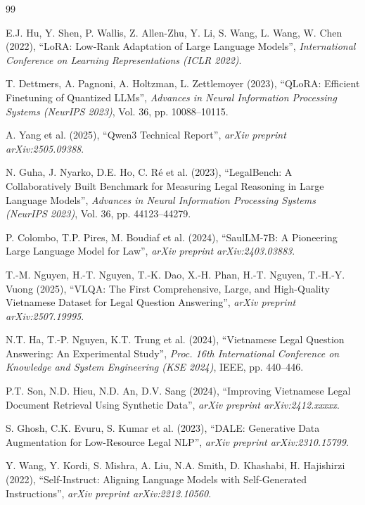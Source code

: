 \begin{thebibliography}{99}

E.J. Hu, Y. Shen, P. Wallis, Z. Allen-Zhu, Y. Li, S. Wang, L. Wang, W. Chen (2022),
``LoRA: Low-Rank Adaptation of Large Language Models'',
\textit{International Conference on Learning Representations (ICLR 2022)}.

T. Dettmers, A. Pagnoni, A. Holtzman, L. Zettlemoyer (2023),
``QLoRA: Efficient Finetuning of Quantized LLMs'',
\textit{Advances in Neural Information Processing Systems (NeurIPS 2023)},
Vol. 36, pp. 10088--10115.

A. Yang et al. (2025),
``Qwen3 Technical Report'',
\textit{arXiv preprint arXiv:2505.09388}.

N. Guha, J. Nyarko, D.E. Ho, C. R\'{e} et al. (2023),
``LegalBench: A Collaboratively Built Benchmark for Measuring Legal Reasoning
in Large Language Models'',
\textit{Advances in Neural Information Processing Systems (NeurIPS 2023)},
Vol. 36, pp. 44123--44279.

P. Colombo, T.P. Pires, M. Boudiaf et al. (2024),
``SaulLM-7B: A Pioneering Large Language Model for Law'',
\textit{arXiv preprint arXiv:2403.03883}.

T.-M. Nguyen, H.-T. Nguyen, T.-K. Dao, X.-H. Phan, H.-T. Nguyen,
T.-H.-Y. Vuong (2025),
``VLQA: The First Comprehensive, Large, and High-Quality Vietnamese
Dataset for Legal Question Answering'',
\textit{arXiv preprint arXiv:2507.19995}.

N.T. Ha, T.-P. Nguyen, K.T. Trung et al. (2024),
``Vietnamese Legal Question Answering: An Experimental Study'',
\textit{Proc. 16th International Conference on Knowledge and
System Engineering (KSE 2024)}, IEEE, pp. 440--446.

P.T. Son, N.D. Hieu, N.D. An, D.V. Sang (2024),
``Improving Vietnamese Legal Document Retrieval Using Synthetic Data'',
\textit{arXiv preprint arXiv:2412.xxxxx}.

S. Ghosh, C.K. Evuru, S. Kumar et al. (2023),
``DALE: Generative Data Augmentation for Low-Resource Legal NLP'',
\textit{arXiv preprint arXiv:2310.15799}.

Y. Wang, Y. Kordi, S. Mishra, A. Liu, N.A. Smith,
D. Khashabi, H. Hajishirzi (2022),
``Self-Instruct: Aligning Language Models with Self-Generated Instructions'',
\textit{arXiv preprint arXiv:2212.10560}.


\end{thebibliography}
